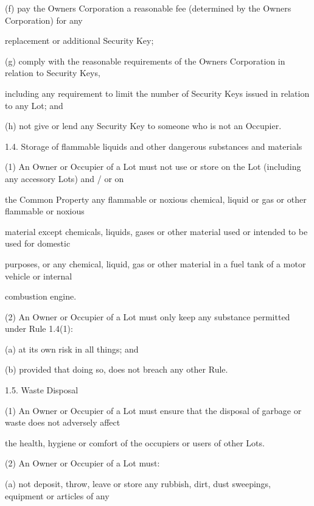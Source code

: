 \documentclass{article}
\begin{document}
{\fontsize{9.962}{1}(f) pay the Owners Corporation a reasonable fee (determined by the Owners Corporation) for any }

{\fontsize{10.02}{1}replacement or additional Security Key; }

{\fontsize{9.962}{1}(g) comply with the reasonable requirements of the Owners Corporation in relation to Security Keys, }

{\fontsize{10.02}{1}including any requirement to limit the number of Security Keys issued in relation to any Lot; and }

{\fontsize{9.962}{1}(h) not give or lend any Security Key to someone who is not an Occupier. }

\newpage

{\fontsize{9.99}{1}1.4. Storage of flammable liquids and other dangerous substances and materials }

{\fontsize{9.962}{1}(1) An Owner or Occupier of a Lot must not use or store on the Lot (including any accessory Lots) and / or on }

{\fontsize{10.02}{1}the Common Property any flammable or noxious chemical, liquid or gas or other flammable or noxious }

{\fontsize{10.02}{1}material except chemicals, liquids, gases or other material used or intended to be used for domestic }

{\fontsize{10.02}{1}purposes, or any chemical, liquid, gas or other material in a fuel tank of a motor vehicle or internal }

{\fontsize{10.02}{1}combustion engine. }

{\fontsize{9.962}{1}(2) An Owner or Occupier of a Lot must only keep any substance permitted under Rule 1.4(1): }

{\fontsize{9.962}{1}(a) at its own risk in all things; and }

{\fontsize{9.962}{1}(b) provided that doing so, does not breach any other Rule. }

{\fontsize{9.99}{1}1.5. Waste Disposal }

{\fontsize{9.962}{1}(1) An Owner or Occupier of a Lot must ensure that the disposal of garbage or waste does not adversely affect }

{\fontsize{10.02}{1}the health, hygiene or comfort of the occupiers or users of other Lots. }

{\fontsize{9.962}{1}(2) An Owner or Occupier of a Lot must: }

{\fontsize{9.962}{1}(a) not deposit, throw, leave or store any rubbish, dirt, dust sweepings, equipment or articles of any }
\end{document}
